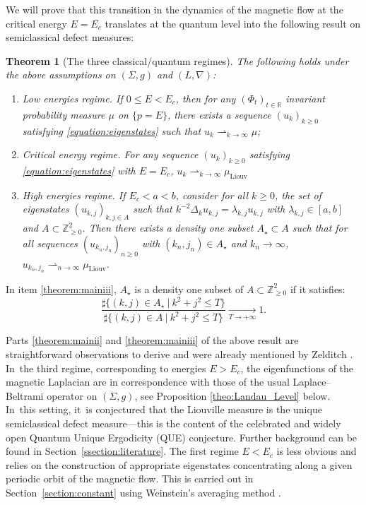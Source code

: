 \documentclass[10pt]{amsart}
\theoremstyle{plain}
\newtheorem{theorem}{Theorem}[section]
\theoremstyle{definition}
\newcommand{\R}{\mathbb{R}}
\newcommand{\Z}{\mathbb{Z}}
\begin{document}
We will prove that this transition in the dynamics of the magnetic flow at the critical energy $E=E_c$ translates at the quantum level into the following result on semiclassical defect measures:

\begin{theorem}[The three classical/quantum regimes]
\label{theorem:main}
The following holds under the above assumptions on $(\Sigma,g)$ and $(L,\nabla)$:
\begin{enumerate}

\item\label{theorem:maini} \emph{Low energies regime.} If $0 \leq E < E_c$, then for any $(\Phi_t)_{t \in \R}$ invariant probability measure $\mu$ on $\{p=E\}$, there exists a sequence $(u_{k})_{k \geq 0}$ satisfying \eqref{equation:eigenstates} such that $u_{k} \rightharpoonup_{k \to \infty} \mu$;

\item\label{theorem:mainii} \emph{Critical energy regime.} For any
sequence $(u_k)_{k \geq 0}$ satisfying \eqref{equation:eigenstates} with $E=E_c$, $u_{k} \rightharpoonup_{k \to \infty} \mu_{\mathrm{Liouv}}$

\item\label{theorem:mainiii} \emph{High energies regime.} If $E_c < a < b$, consider for
all $k \geq 0$, the set of eigenstates $(u_{k,j})_{k,j \in A}$ such that
$k^{-2} \Delta_k u_{k,j} = \lambda_{k,j} u_{k,j}$ with $\lambda_{k,j} \in
[a,b]$ and $A \subset \Z_{\geq 0}^2$. Then there exists a density one subset
$A_\star \subset A$ such that for all sequences $(u_{k_n,j_n})_{n \geq 0}$
with $(k_n,j_n) \in A_\star$ and $k_n \to \infty$, $u_{k_n,j_n} \rightharpoonup_{n \to \infty} \mu_{\mathrm{Liouv}}$.
\end{enumerate}
\end{theorem}

In item \eqref{theorem:mainiii}, $A_\star$ is a density one subset of $A \subset \Z^2_{\geq 0}$ if it satisfies:
\[
\dfrac{\sharp\{ (k,j) \in A_\star ~|~ k^2+j^2 \leq T\}}{\sharp\{ (k,j) \in A ~|~ k^2 + j^2 \leq T\}} \underset{T \to +\infty}\to 1.
\]

Parts \eqref{theorem:mainii} and \eqref{theorem:mainiii} of the above result are straightforward observations to
derive and were already mentioned by Zelditch \cite[p.\,20–21]{Zelditch-92}. In~the third regime, corresponding to energies $E > E_c$, the eigenfunctions
of the magnetic Laplacian are in correspondence with those of the usual
Laplace–Beltrami operator on $(\Sigma,g)$, see Proposition \ref{theo:Landau_Level} below. In~this setting, it~is conjectured that the
Liouville measure is the unique semiclassical defect measure—this is the
content of the celebrated and widely open Quantum Unique Ergodicity (QUE)
conjecture. Further background can be found in Section~\ref{ssection:literature}.
The first regime $E < E_c$ is less obvious and relies on the construction of
appropriate eigenstates concentrating along a given periodic orbit of the
magnetic flow. This is carried out in Section~\ref{section:constant} using
Weinstein's averaging method \cite{Weinstein-77}.
\end{document}
